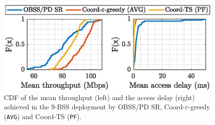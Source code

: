 \begin{figure}[t!]
    \centering
    \includegraphics[width=\linewidth]{figures/cdf_mean_throughput_best_new.eps}
    \caption{CDF of the mean throughput (left) and the access delay (right) achieved in the $9$-BSS deployment by OBSS/PD SR, Coord-$\varepsilon$-greedy (\texttt{AVG}) and Coord-TS (\texttt{PF}).}
    \label{fig:cdf_mean_throughput_best}
\end{figure}